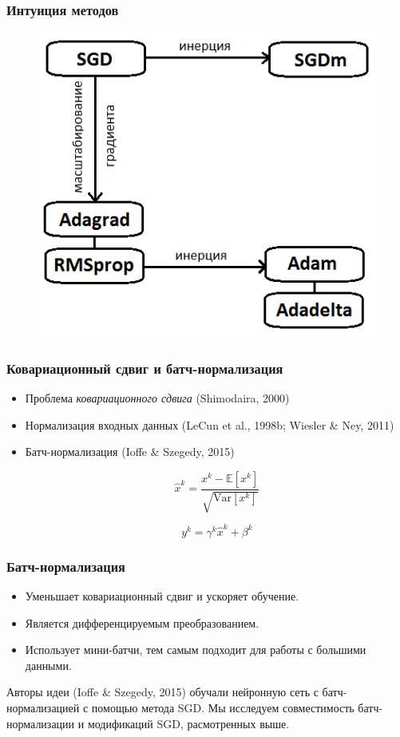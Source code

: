 \documentclass{beamer}
\begin{document}
\begin{frame}
\frametitle{Интуиция методов}
\begin{figure}
\includegraphics[scale=0.5]{methods.png}
\end{figure}
\end{frame}


\begin{frame}
	\frametitle{Ковариационный сдвиг и батч-нормализация}
	
\begin{itemize}
\item Проблема \textit{ковариационного сдвига} (Shimodaira, 2000)
\item Нормализация входных данных  (LeCun  et  al.,  1998b;  Wiesler \&  Ney,
2011)
\item Батч-нормализация (Ioffe \& Szegedy, 2015)

\begin{equation}
\hat{x}^k = \frac{x^k - \mathbb{E}[x^k]}{\sqrt{\mathrm{Var}[x^k]}}
\end{equation}


\begin{equation}
y^k = \gamma^k \hat{x}^k + \beta^k
\end{equation}
\end{itemize}

\end{frame}


\begin{frame}
	\frametitle{Батч-нормализация}

\begin{itemize}
\item Уменьшает ковариационный сдвиг и ускоряет обучение.
\item Является дифференцируемым преобразованием.
\item Использует мини-батчи, тем самым подходит для работы с большими данными.
\end{itemize}

Авторы идеи (Ioffe \& Szegedy, 2015) обучали нейронную сеть с батч-нормализацией с помощью метода SGD. Мы исследуем совместимость батч-нормализации и модификаций SGD, расмотренных выше.
\end{frame}
\end{document}
